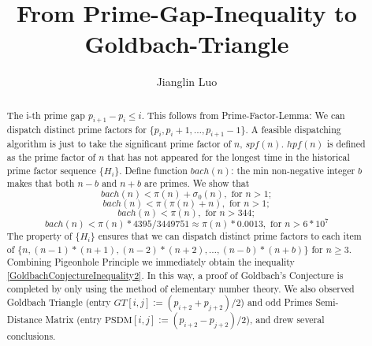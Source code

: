 \documentclass[12pt,a4paper,reqno]{amsart}
\numberwithin{equation}{section}
\theoremstyle{plain}
\theoremstyle{definition}
\begin{document}
	
	\title{From Prime-Gap-Inequality to Goldbach-Triangle}
	
	\author{Jianglin Luo}
	\address{WangYueHu Community 1-pian 7-dong, Changsha, China 230026.}
	
	
	
	\begin{abstract}
		The i-th prime gap $p_{i+1}-p_{i}\leq i$. This follows from 
		Prime-Factor-Lemma: We can dispatch distinct prime factors for 
		$\{p_i,p_i+1,\dots,p_{i+1}-1\}$. A feasible dispatching algorithm 
		is just to take the significant prime factor of $n$, $spf(n)$. 
		$hpf(n)$ is defined as the prime factor of $n$ that has not appeared for the 
		longest time in the historical prime factor sequence $\{H_i\}$. 
		Define function $bach(n)$: the min non-negative integer $b$ makes 
		that both $n-b$ and $n+b$ are primes. We show that 
	\begin{equation}\label{GoldbachConjectureInequality1}
		bach(n) < \pi(n)+\sigma_0(n) ,\text{ for } n>1;
	\end{equation}
	\begin{equation}\label{GoldbachConjectureInequality2}
		bach(n) < \pi(\pi(n)+n) ,\text{ for }  n>1;
	\end{equation}
	\begin{equation}\label{GoldbachConjectureInequality3}
		bach(n) < \pi(n), \text{ for } n>344; 
	\end{equation}
	\begin{equation}\label{GCInequality4}
		bach(n) < \pi(n)*4395/3449751\approx\pi(n)*0.0013,\text{ for } n>6*10^7
	\end{equation}
	The property of $\{H_i\}$ ensures that we can dispatch distinct prime 
	factors to each item of  
	$\{n,(n-1)*(n+1),(n-2)*(n+2),\dots,(n-b)*(n+b)\}$ for $n \geq 3$. 
	Combining Pigeonhole Principle we immediately obtain 
	the inequality \eqref{GoldbachConjectureInequality2}. In this way, 
	a proof of Goldbach's Conjecture is completed by only using the method 
	of elementary number theory. We also observed Goldbach Triangle 
	(entry $GT[i,j]:=(p_{i+2}+p_{j+2})/2$) and odd Primes Semi-Distance Matrix
	(entry $\text{PSDM}[i,j]:=(p_{i+2}-p_{j+2})/2$), and drew several conclusions.
	
	\end{abstract}
	
	\maketitle
	
\end{document}
